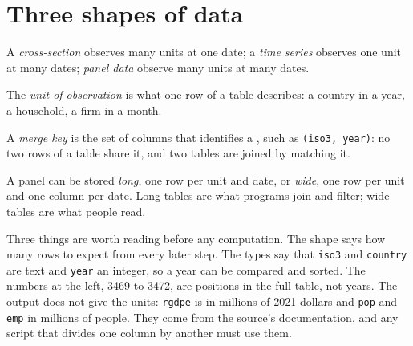 \section{Three shapes of data}\label{sec:b1:economic-data-python:shapes}

\begin{definition}\label{def:b1:economic-data-python:shapes}
A \emph{cross-section} observes many units at one date; a \emph{time series}
observes one unit at many dates; \emph{panel data} observe many units at many
dates.
\end{definition}

\begin{definition}\label{def:b1:economic-data-python:unit}
The \emph{unit of observation} is what one row of a table describes: a
country in a year, a household, a firm in a month.
\end{definition}

\begin{definition}\label{def:b1:economic-data-python:key}
A \emph{merge key} is the set of columns that identifies a , such as \texttt{(iso3, year)}: no two rows of a table share it,
and two tables are joined by matching it.
\end{definition}

A panel can be stored \emph{long}, one row per unit and date, or \emph{wide},
one row per unit and one column per date. Long tables are what programs
join and filter; wide tables are what people read.

\label{lst:b1:economic-data-python:first-look}

\label{out:b1:economic-data-python:first-look}

Three things are worth reading before any computation. The shape says how
many rows to expect from every later step. The types say that
\texttt{iso3} and \texttt{country} are text and \texttt{year} an integer, so a year
can be compared and sorted. The numbers at the left, 3469 to 3472, are
positions in the full table, not years. The output does not give the units:
\texttt{rgdpe} is in millions of 2021 dollars and \texttt{pop} and \texttt{emp} in
millions of people. They come from the source's documentation, and any script
that divides one column by another must use them.

